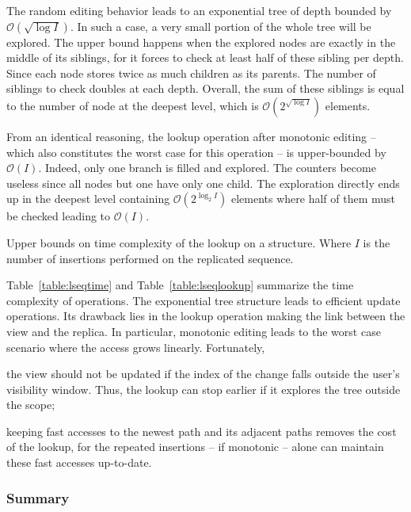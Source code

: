 The random editing behavior leads to an exponential tree of depth bounded by
$\mathcal{O}(\sqrt{\log I})$. In such a case, a very small portion of the whole
tree will be explored. The upper bound happens when the explored nodes are
exactly in the middle of its siblings, for it forces to check at least half of
these sibling per depth. Since each node stores twice as much children as its
parents. The number of siblings to check doubles at each depth. Overall, the sum
of these siblings is equal to the number of node at the deepest level, which is
$\mathcal{O}(2^{\sqrt{\log I}})$ elements. 

From an identical reasoning, the lookup operation after monotonic editing --
which also constitutes the worst case for this operation -- is upper-bounded by
$\mathcal{O}(I)$. Indeed, only one branch is filled and explored. The counters
become useless since all nodes but one have only one child. The exploration
directly ends up in the deepest level containing $\mathcal{O}(2^{\log_2 I})$
elements where half of them must be checked leading to
$\mathcal{O}(I)$.

\begin{table}
  \caption{\label{table:lseqlookup}
    Upper bounds on time complexity of the lookup on a \LSEQ structure.
    Where $I$ is the number of insertions performed on the replicated sequence.}
  \centering
  
\end{table}

Table~\ref{table:lseqtime} and Table~\ref{table:lseqlookup} summarize the time
complexity of operations. The exponential tree structure leads to efficient
update operations. Its drawback lies in the lookup operation making the link
between the view and the replica. In particular, monotonic editing leads to the
worst case scenario where the access grows linearly. Fortunately,
\begin{inparaenum}[(i)]
\item the view should not be updated if the index of the change falls outside
  the user's visibility window. Thus, the lookup can stop earlier if it explores
  the tree outside the scope;
\item keeping fast accesses to the newest path and its adjacent paths removes
  the cost of the lookup, for the repeated insertions -- if monotonic -- alone
  can maintain these fast accesses up-to-date.
\end{inparaenum}

\subsubsection{Summary}

